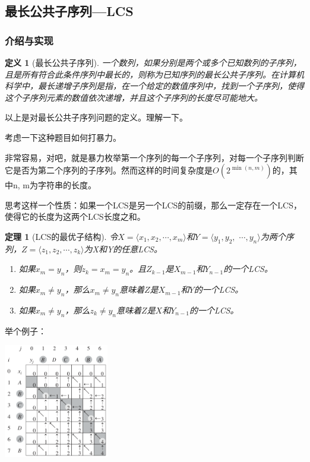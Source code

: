 \documentclass{article}
\newtheorem{definition}{定义}[subsection]
\newtheorem{thm}{定理}[subsection]
\theoremstyle{nonumberplain}
\begin{document}
\subsection{最长公共子序列---LCS}
\subsubsection{介绍与实现}
\begin{definition}[最长公共子序列]
一个数列，如果分别是两个或多个已知数列的子序列，且是所有符合此条件序列中最长的，则称为已知序列的最长公共子序列。在计算机科学中，最长递增子序列是指，在一个给定的数值序列中，找到一个子序列，使得这个子序列元素的数值依次递增，并且这个子序列的长度尽可能地大。
\end{definition}

以上是对最长公共子序列问题的定义。理解一下。

考虑一下这种题目如何打暴力。

非常容易，对吧，就是暴力枚举第一个序列的每一个子序列，对每一个子序列判断它是否为第二个序列的子序列。然而这样的时间复杂度是$O(2^{\min(n,m)})$的，其中n, m为字符串的长度。

思考这样一个性质：如果一个LCS是另一个LCS的前缀，那么一定存在一个LCS，使得它的长度为这两个LCS长度之和。

\begin{thm}[LCS的最优子结构]
	令$X=\langle x_1, x_2, \cdots, x_m\rangle$和$Y=\langle y_1, y_2,$ $\cdots,y_n\rangle$为两个序列，$Z=\langle z_1, z_2, \cdots, z_k\rangle$为X和Y的任意LCS。
	\begin{enumerate}
		\item{如果$x_m=y_n$，则$z_k=x_m=y_n$。且$Z_{k-1}$是$X_{m-1}$和$Y_{n-1}$的一个LCS。}
		\item{如果$x_m\neq y_n$，那么$x_m\neq y_n$意味着$Z$是$X_{m-1}$和$Y$的一个LCS。}
		\item{如果$x_m\neq y_n$，那么$z_k\neq y_n$意味着$Z$是$X$和$Y_{n-1}$的一个LCS。}
	\end{enumerate}
\end{thm}

举个例子：
\begin{center}\includegraphics[height=5cm]{CLRS_LCS.png}\end{center}
\end{document}
